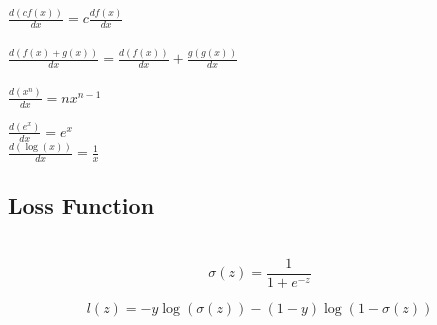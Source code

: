 \documentclass[11pt]{article}
\begin{document}
\begin{flushleft}
\centering
$\frac{d(cf(x))}{dx}= c\frac{df(x)}{dx}$   \\
\quad \\ \quad\quad
$\frac{d(f(x)+g(x))}{dx}=\frac{d(f(x))}{dx}+\frac{g(g(x))}{dx}$ \\
\quad \\
\quad\quad\quad\quad\quad\quad\quad\quad\quad
$\frac{d(x^n)}{dx}=nx^{n-1}$ 
\newline

${\displaystyle \frac{d(e^x)}{dx}= e^x}$ \\
${\displaystyle \frac{d(\log(x))}{dx}=\frac{1}{x}}$ \\
\end{flushleft}

\begin{flushleft}
\subsection{Loss Function}
\quad \\
$$\sigma(z)=\frac{1}{1+e^{−z}}$$

$$l(z) = -y\log(\sigma(z)) - (1−y)\log⁡(1−\sigma(z))$$

\end{flushleft}
\end{document}
